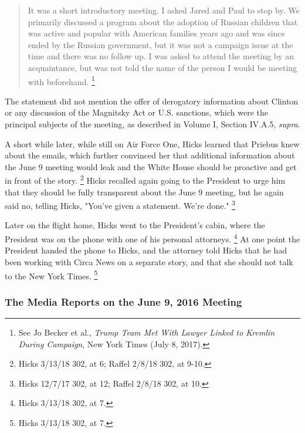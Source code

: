 {\begin{quote}
It was a short introductory meeting.
I asked Jared and Paul to stop by.
We primarily discussed a program about the adoption of Russian children that was active and popular with American families years ago and was since ended by the Russian government, but it was not a campaign issue at the time and there was no follow up.
I was asked to attend the meeting by an acquaintance, but was not told the name of the person I would be meeting with beforehand.%
\footnote{See Jo Becker et al., \textit{Trump Team Met With Lawyer Linked to Kremlin During Campaign}, New York Times (July 8, 2017).}
\end{quote}

The statement did not mention the offer of derogatory information about Clinton or any discussion of the Magnitsky Act or U.S. sanctions, which were the principal subjects of the meeting, as described in Volume I, Section IV.A.5, \textit{supra}.

A short while later, while still on Air Force One, Hicks learned that Priebus knew about the emails, which further convinced her that additional information about the June 9 meeting would leak and the White House should be proactive and get in front of the story.%
\footnote{Hicks 3/13/18 302, at 6;
Raffel 2/8/18 302, at 9-10.}
Hicks recalled again going to the President to urge him that they should be fully transparent about the June 9 meeting, but he again said no, telling Hicks, "You've given a statement.
We're done."%
\footnote{Hicks 12/7/17 302, at 12;
Raffel 2/8/18 302, at 10.}

Later on the flight home, Hicks went to the President's cabin, where the President was on the phone with one of his personal attorneys.%
\footnote{Hicks 3/13/18 302, at 7.}
At one point the President handed the phone to Hicks, and the attorney told Hicks that he had been working with Circa News on a separate story, and that she should not talk to the New York Times.%
\footnote{Hicks 3/13/18 302, at 7.}

\subsubsection{The Media Reports on the June 9, 2016 Meeting}

}
